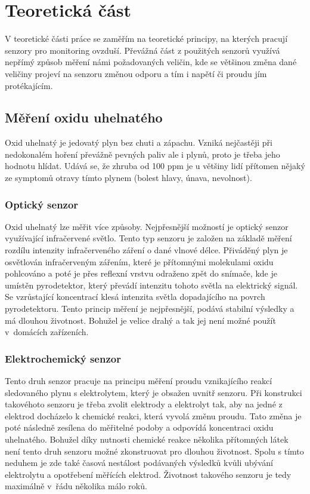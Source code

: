 \chapter{Teoretická část}

V teoretické části práce se zaměřím na teoretické principy, na kterých pracují senzory pro monitoring ovzduší. Převážná část z použitých senzorů využívá nepřímý způsob měření námi požadovaných veličin, kde se většinou změna dané veličiny projeví na senzoru změnou odporu a tím i napětí či proudu jím protékajícím.

\section{Měření oxidu uhelnatého}

Oxid uhelnatý je jedovatý plyn bez chuti a zápachu. Vzniká nejčastěji při nedokonalém hoření převážně pevných paliv ale i plynů, proto je třeba jeho hodnotu hlídat. Udává se, že zhruba od 100 ppm je u většiny lidí přítomen nějaký ze symptomů otravy tímto plynem (bolest hlavy, únava, nevolnost).

\subsection{Optický senzor}

Oxid uhelnatý lze měřit více způsoby. Nejpřesnější možností je optický senzor využívající infračervené světlo. Tento typ senzoru je založen na základě měření rozdílu intenzity infračerveného záření o dané vlnové délce. Přiváděný plyn je osvětlován infračerveným zářením, které je přítomnými molekulami oxidu pohlcováno a poté je přes reflexní vrstvu odraženo zpět do snímače, kde je umístěn pyrodetektor, který převádí intenzitu tohoto světla na elektrický signál. Se vzrůstající koncentrací klesá intenzita světla dopadajícího na povrch pyrodetektoru. Tento princip měření je nejpřesnější, podává stabilní výsledky a má dlouhou životnost. Bohužel je velice drahý a tak jej není možné použít v~domácích zařízeních.

\subsection{Elektrochemický senzor}

Tento druh senzor pracuje na principu měření proudu vznikajícího reakcí sledovaného plynu s elektrolytem, který je obsažen uvnitř senzoru. Při konstrukci takovéhoto senzoru je třeba zvolit elektrody a elektrolyt tak, aby na jedné z elektrod docházelo k chemické reakci, která vyvolá změnu proudu. Tato změna je poté následně zesílena do měřitelné podoby a odpovídá koncentraci oxidu uhelnatého. Bohužel díky nutnosti chemické reakce několika přítomných látek není tento druh senzoru možné zkonstruovat pro dlouhou životnost. Spolu s tímto neduhem je zde také časová nestálost podávaných výsledků kvůli ubývání elektrolytu a opotřebení měřících elektrod. Životnost takového senzoru je tedy maximálně v~řádu několika málo roků. 

